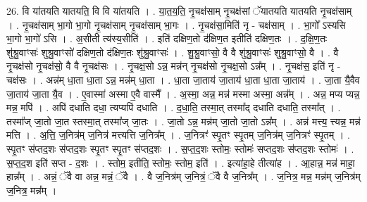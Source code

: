 \documentclass[17pt]{extarticle}
\begin{document}
26. वि या॑तयति यातयति॒ वि वि या॑तयति । . या॒त॒य॒ति॒ नृ॒चक्ष॑साम् नृ॒चक्ष॑सां ॅयातयति यातयति नृ॒चक्ष॑साम् । . नृ॒चक्ष॑साम् भा॒गो भा॒गो नृ॒चक्ष॑साम् नृ॒चक्ष॑साम् भा॒गः । . नृ॒चक्ष॑सा॒मिति॑ नृ - चक्ष॑साम् । . भा॒गो᳚ ऽस्यसि भा॒गो भा॒गो॑ ऽसि । . अ॒सीती त्य॑स्य॒सीति॑ । . इति॑ दक्षिण॒तो द॑क्षिण॒त इतीति॑ दक्षिण॒तः । . द॒क्षि॒ण॒तः शु॑श्रु॒वाꣳसः॑ शुश्रु॒वाꣳसो॑ दक्षिण॒तो द॑क्षिण॒तः शु॑श्रु॒वाꣳसः॑ । . शु॒श्रु॒वाꣳसो॒ वै वै शु॑श्रु॒वाꣳसः॑ शुश्रु॒वाꣳसो॒ वै । . वै नृ॒चक्ष॑सो नृ॒चक्ष॑सो॒ वै वै नृ॒चक्ष॑सः । . नृ॒चक्ष॒सो ऽन्न॒ मन्न॑न् नृ॒चक्ष॑सो नृ॒चक्ष॒सो ऽन्न᳚म् । . नृ॒चक्ष॑स॒ इति॑ नृ - चक्ष॑सः । . अन्न॑म् धा॒ता धा॒ता ऽन्न॒ मन्न॑म् धा॒ता । . धा॒ता जा॒ताय॑ जा॒ताय॑ धा॒ता धा॒ता जा॒ताय॑ । . जा॒ता यै॒वैव जा॒ताय॑ जा॒ता यै॒व । . ए॒वास्मा॑ अस्मा ए॒वै वास्मै᳚ । . अ॒स्मा॒ अन्न॒ मन्न॑ मस्मा अस्मा॒ अन्न᳚म् । . अन्न॒ मप्य प्यन्न॒ मन्न॒ मपि॑ । . अपि॑ दधाति दधा॒ त्यप्यपि॑ दधाति । . द॒धा॒ति॒ तस्मा॒त् तस्मा᳚द् दधाति दधाति॒ तस्मा᳚त् । . तस्मा᳚ज् जा॒तो जा॒त स्तस्मा॒त् तस्मा᳚ज् जा॒तः । . जा॒तो ऽन्न॒ मन्न॑म् जा॒तो जा॒तो ऽन्न᳚म् । . अन्न॑ मत्त्य॒ त्त्यन्न॒ मन्न॑ मत्ति । . अ॒त्ति॒ ज॒नित्र॑म् ज॒नित्र॑ मत्त्यत्ति ज॒नित्र᳚म् । . ज॒नित्रꣳ॑ स्पृ॒तꣳ स्पृ॒तम् ज॒नित्र॑म् ज॒नित्रꣳ॑ स्पृ॒तम् । . स्पृ॒तꣳ स॑प्तद॒शः स॑प्तद॒शः स्पृ॒तꣳ स्पृ॒तꣳ स॑प्तद॒शः । . स॒प्त॒द॒शः स्तोमः॒ स्तोमः॑ सप्तद॒शः स॑प्तद॒शः स्तोमः॑ । . स॒प्त॒द॒श इति॑ सप्त - द॒शः । . स्तोम॒ इतीति॒ स्तोमः॒ स्तोम॒ इति॑ । . इत्या॑हा॒हे तीत्या॑ह । . आ॒हान्न॒ मन्न॑ माहा॒ हान्न᳚म् । . अन्नं॒ ॅवै वा अन्न॒ मन्नं॒ ॅवै । . वै ज॒नित्र॑म् ज॒नित्रं॒ ॅवै वै ज॒नित्र᳚म् । . ज॒नित्र॒ मन्न॒ मन्न॑म् ज॒नित्र॑म् ज॒नित्र॒ मन्न᳚म् । \newline
\end{document}
